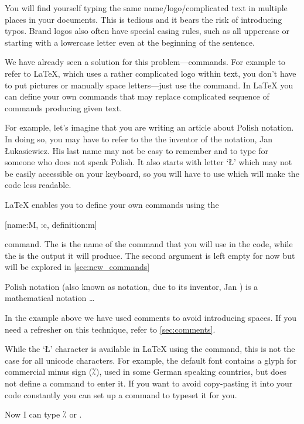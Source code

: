 You will find yourself typing the same name\slash{}logo\slash{}complicated text
in multiple places in your documents. This is tedious and it bears the risk of
introducing typos. Brand logos also often have special casing rules, such as
all uppercase or starting with a lowercase letter even at the beginning of the
sentence.

We have already seen a solution for this problem---commands. For example to
refer to \LaTeX{}, which uses a rather complicated logo within text, you don't
have to put pictures or manually space letters---just use the 
command. In \LaTeX{} you can define your own commands that may replace
complicated sequence of commands producing given text.

For example, let's imagine that you are writing an article about Polish
notation. In doing so, you may have to refer to the the inventor of the
notation, Jan Łukasiewicz. His last name may not be easy to remember and to
type for someone who does not speak Polish. It also starts with letter
\enquote*{Ł} which may not be easily accessible on your keyboard, so you will
have to use  which will make the code less readable.

\LaTeX{} enables you to define your own commands using the
\begin{lscommand}
  [name:M, {{}}:c, definition:m]
\end{lscommand}
command. The  is the name of the command that you will use in the
code, while the  is the output it will produce. The second
argument is left empty for now but will be explored in
\autoref{sec:new_commands}
\begin{example}

Polish notation (also known as
\lukas{} notation, due to its
inventor, Jan \lukas) is a
mathematical notation \ldots{}
\end{example}
In the example above we have used \ai{\%} comments to avoid introducing spaces.
If you need a refresher on this technique, refer to \autoref{sec:comments}.

While the \enquote*{Ł} character is available in \LaTeX{} using the 
command, this is not the case for all unicode characters. For example, the
default font contains a glyph for commercial minus sign (⁒), used in some German
speaking countries, but does not define a command to enter it. If you want to
avoid copy-pasting it into your code constantly you can set up a command to
typeset it for you.
\begin{example}

Now I can type ⁒ or \comminus.
\end{example}

